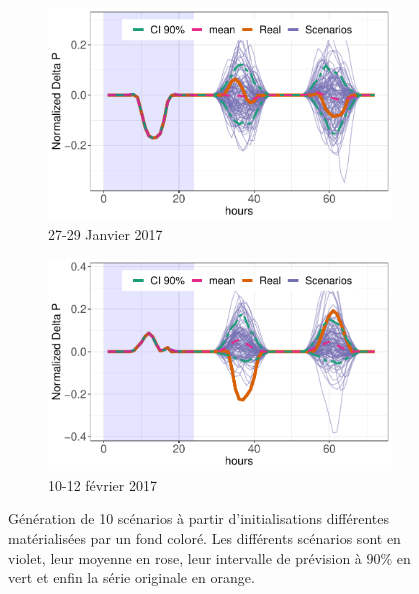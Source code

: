 \documentclass[12pt]{report}
\begin{document}
\begin{figure}[htbp]
\begin{center}
		\begin{subfigure}[b]{0.5\linewidth}
			\centering
			\includegraphics[width = 0.95 \linewidth]{Images/PV/HMM/id27.pdf}
			\caption{27-29 Janvier 2017}
		\end{subfigure}%
		\begin{subfigure}[b]{0.5\linewidth}
			\centering
			\includegraphics[width = 0.95 \linewidth]{Images/PV/HMM/id41.pdf}
			\caption{10-12 février 2017}
		\end{subfigure}
	\end{center}
	
	\caption{Génération de 10 scénarios à partir d'initialisations différentes matérialisées par un fond coloré. Les différents scénarios sont en violet, leur moyenne en rose, leur intervalle de prévision à $90\%$ en vert et enfin la série originale en orange.}
	\label{fig:PV_HMM_Scenarios} 
\end{figure}
\end{document}
